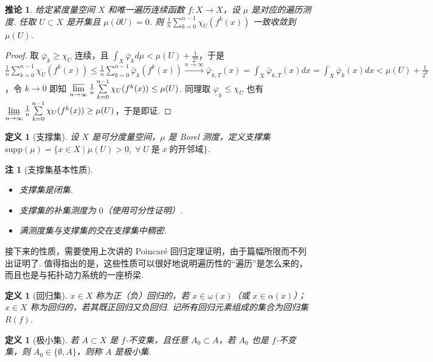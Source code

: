 \documentclass[11pt, a4paper, oneside]{ctexart}
\newtheorem{corollary}[theorem]{推论}
\newtheorem{definition}[theorem]{定义}
\newtheorem{remark}[theorem]{注}
\newcommand{\supp}{\mathrm{supp}}
\begin{document}
    \begin{corollary}
        给定紧度量空间 $X$ 和唯一遍历连续函数 $f:X\to X$，设 $\mu$ 是对应的遍历测度. 任取 $U\subset X$ 是开集且 $\mu(\partial U)=0$. 则 $\frac{1}{n}\sum\limits_{k=0}^{n-1}\chi_U(f^k(x))$ 一致收敛到 $\mu(U)$.
    \end{corollary}
    \begin{proof}
        取 $\bar{\varphi}_k\geq \chi_U$ 连续，且 $\int_{X}\bar{\varphi}_k d\mu<\mu(U)+\frac{1}{2^n}$，于是 $\frac{1}{n}\sum\limits_{k=0}^{n-1}\chi_U(f^k(x))\leq \frac{1}{n}\sum\limits_{k=0}^{n-1}\bar{\varphi}_k(f^k(x))\stackrel{n\to\infty}{\longrightarrow}\bar{\varphi}_{k,T}(x)=\int_{X}\bar{\varphi}_{k,T}(x)dx=\int_{X}\bar{\varphi}_k(x)dx<\mu(U)+\frac{1}{2^k}$，令 $k\to 0$ 即知 $\varlimsup\limits_{n\to\infty}\frac{1}{n}\sum\limits_{k=0}^{n-1}\chi_U(f^k(x))\leq \mu(U)$. 同理取 $\underline{\varphi}_k\leq \chi_U$ 也有 $\varliminf\limits_{n\to\infty}\frac{1}{n}\sum\limits_{k=0}^{n-1}\chi_U(f^k(x))\geq \mu(U)$，于是即证.
    \end{proof}

    \begin{definition}[支撑集]
        设 $X$ 是可分度量空间，$\mu$ 是 Borel 测度，定义支撑集 $\supp(\mu)=\{x\in X\mid \mu(U)>0,\; \forall\; U\;\text{是}\;x\;\text{的开邻域}\}$.
    \end{definition}
    \begin{remark}[支撑集基本性质]
        \begin{itemize}
            \item 支撑集是闭集.
            \item 支撑集的补集测度为 $0$（使用可分性证明）.
            \item 满测度集与支撑集的交在支撑集中稠密.
        \end{itemize}
    \end{remark}

    接下来的性质，需要使用上次讲的 Poincaré 回归定理证明，由于篇幅所限而不列出证明了. 值得指出的是，这些性质可以很好地说明遍历性的“遍历”是怎么来的，而且也是与拓扑动力系统的一座桥梁.

    \begin{definition}[回归集]
        $x\in X$ 称为正（负）回归的，若 $x\in \omega(x)$（或 $x\in\alpha(x)$）；$x\in X$ 称为回归的，若其既正回归又负回归. 记所有回归元素组成的集合为回归集 $R(f)$.
    \end{definition}
    \begin{definition}[极小集]
        若 $A\subset X$ 是 $f$-不变集，且任意 $A_0\subset A$，若 $A_0$ 也是 $f$-不变集，则 $A_0\in\{\emptyset,A\}$，则称 $A$ 是极小集.
    \end{definition}
\end{document}
